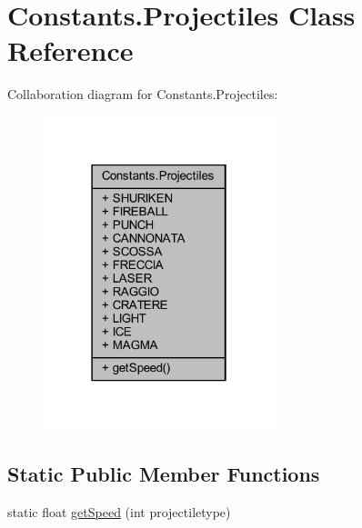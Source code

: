\hypertarget{classhelpz_1_1_constants_1_1_projectiles}{}\section{Constants.\+Projectiles Class Reference}
\label{classhelpz_1_1_constants_1_1_projectiles}


Collaboration diagram for Constants.\+Projectiles\+:\nopagebreak
\begin{figure}[H]
\begin{center}
\leavevmode
\includegraphics[width=190pt]{classhelpz_1_1_constants_1_1_projectiles__coll__graph}
\end{center}
\end{figure}
\subsection*{Static Public Member Functions}
\begin{DoxyCompactItemize}
\item 
static float \hyperlink{classhelpz_1_1_constants_1_1_projectiles_a28b031e39773be6063f30deedbaad662}{get\+Speed} (int projectiletype)
\end{DoxyCompactItemize}
